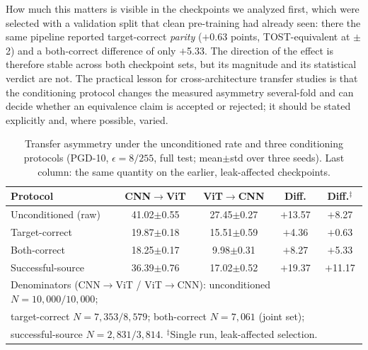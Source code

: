 \documentclass[conference]{IEEEtran}
\newcommand{\eps}{\epsilon}
\begin{document}
How much this matters is visible in the checkpoints we analyzed first, which were selected with a validation split that clean pre-training had already seen: there the same pipeline reported target-correct \emph{parity} ($+$0.63 points, TOST-equivalent at $\pm$2) and a both-correct difference of only $+$5.33. The direction of the effect is therefore stable across both checkpoint sets, but its magnitude and its statistical verdict are not. The practical lesson for cross-architecture transfer studies is that the conditioning protocol changes the measured asymmetry several-fold and can decide whether an equivalence claim is accepted or rejected; it should be stated explicitly and, where possible, varied.

\begin{table}[!t]
\centering
\caption{Transfer asymmetry under the unconditioned rate and three conditioning protocols (PGD-10, $\eps=8/255$, full test; mean$\pm$std over three seeds). Last column: the same quantity on the earlier, leak-affected checkpoints.}
\label{tab:protocols}
\scriptsize
\setlength{\tabcolsep}{2.5pt}
\begin{tabular}{lcccc}
\toprule
\textbf{Protocol} & \textbf{CNN$\rightarrow$ViT} & \textbf{ViT$\rightarrow$CNN} & \textbf{Diff.} & \textbf{Diff.$^{\ddagger}$} \\
\midrule
Unconditioned (raw) & 41.02$\pm$0.55 & 27.45$\pm$0.27 & $+$13.57 & $+$8.27 \\
Target-correct & 19.87$\pm$0.18 & 15.51$\pm$0.59 & $+$4.36 & $+$0.63 \\
Both-correct & 18.25$\pm$0.17 & 9.98$\pm$0.31 & $+$8.27 & $+$5.33 \\
Successful-source & 36.39$\pm$0.76 & 17.02$\pm$0.52 & $+$19.37 & $+$11.17 \\
\bottomrule
\multicolumn{5}{l}{\scriptsize Denominators (CNN$\rightarrow$ViT / ViT$\rightarrow$CNN): unconditioned $N=10{,}000/10{,}000$;}\\
\multicolumn{5}{l}{\scriptsize target-correct $N=7{,}353/8{,}579$; both-correct $N=7{,}061$ (joint set);}\\
\multicolumn{5}{l}{\scriptsize successful-source $N=2{,}831/3{,}814$. $^{\ddagger}$Single run, leak-affected selection.}
\end{tabular}
\end{table}
\end{document}
